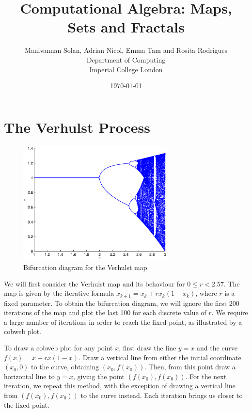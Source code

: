 \documentclass[a4paper]{article}
\begin{document}
\title{Computational Algebra: Maps, Sets and Fractals}
\author{Manivannan Solan, Adrian Nicol, Emma Tam and Rosita Rodrigues\\
Department of Computing\\
Imperial College London}
\date{\today}
\maketitle

\section{The Verhulst Process}

\begin{figure}
  \centering
    \includegraphics[width=0.7\textwidth]{verhulstbifur}
    \caption{Bifurcation diagram for the Verhulst map}
    \centering
\end{figure}


We will first consider the Verhulst map and its behaviour for $ 0 \leq r < 2.57 $. The map is given by the iterative formula $ x_{k+1} = x_k + rx_k(1-x_k) $, where $ r $ is a fixed parameter. To obtain the bifurcation diagram, we will ignore the first 200 iterations of the map and plot the last 100 for each discrete value of $r$. We require a large number of iterations in order to reach the fixed point, as illustrated by a cobweb plot.

To draw a cobweb plot for any point $ x $, first draw the line $ y = x $ and the curve $ f(x) = x + rx(1-x) $.  Draw a vertical line from either the initial coordinate $ (x_0,0) $ to the curve, obtaining $ (x_0,f(x_0)) $. Then, from this point draw a horizontal line to $ y = x $, giving the point $ (f(x_0),f(x_0)) $. For the next iteration, we repeat this method, with the exception of drawing a vertical line from $ (f(x_0),f(x_0)) $ to the curve instead. Each iteration brings us closer to the fixed point. 
\end{document}
